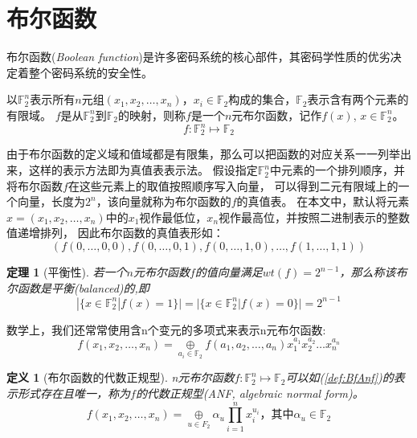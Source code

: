 \documentclass{xduugthesis}
\newtheorem{definition}{定义}
\begin{document}
\section{布尔函数}

布尔函数(\emph{Boolean function})是许多密码系统的核心部件，其密码学性质的优劣决定着整个密码系统的安全性。\par
以$\mathbb{F}_2^n$表示所有$n$元组$(x_1, x_2, \dots ,x_n)$，$x_i\in \mathbb{F}_2$构成的集合，$\mathbb{F}_2$表示含有两个元素的有限域。
$f$是从$\mathbb{F}_2^n$到$\mathbb{F}_2$的映射，则称$f$是一个$n$元布尔函数，记作$f(x)$, $x\in \mathbb{F}_2^n$。
$$
    f: \mathbb{F}_2^n \mapsto \mathbb{F}_2
$$

由于布尔函数的定义域和值域都是有限集，那么可以把函数的对应关系一一列举出来，这样的表示方法即为真值表表示法。
假设指定$\mathbb{F}_2^n$中元素的一个排列顺序，并将布尔函数$f$在这些元素上的取值按照顺序写入向量，
可以得到二元有限域上的一个向量，长度为$2^n$，该向量就称为布尔函数的$f$的真值表。
在本文中，默认将元素$x=(x_1, x_2, \dots , x_n)$中的$x_1$视作最低位，$x_n$视作最高位，并按照二进制表示的整数值递增排列，
因此布尔函数的真值表形如：
$$
    (f(0,\dots ,0,0), f(0,\dots ,0,1), f(0,\dots ,1,0),\dots ,f(1,\dots ,1,1))
$$\par

\newtheorem{mytheorem}{定理}[section]
\begin{mytheorem}[平衡性]\label{thm:balance}
    若一个$n$元布尔函数$f$的值向量满足$wt(f)=2^{n-1}$，那么称该布尔函数是平衡(\emph{balanced})的,即
    \begin{equation}
        |\{x\in \mathbb{F}_2^n |f(x)=1 \}| = |\{x\in \mathbb{F}_2^n |f(x)=0 \}| = 2^{n-1} 
    \end{equation}\par
\end{mytheorem}\par

数学上，我们还常常使用含n个变元的多项式来表示n元布尔函数:
\begin{equation}
    f(x_1,x_2,\dots ,x_n) = \mathop{\oplus}\limits_{a_i \in \mathbb{F}_2}f(a_1,a_2,\dots,a_n)x_1^{a_1}x_2^{a_2}\dots x_n^{a_n}
\end{equation}\par

\begin{definition}[布尔函数的代数正规型]
n元布尔函数$f:\mathbb{F}_2^n \mapsto \mathbb{F}_2$可以如(\ref{def:BfAnf})的表示形式存在且唯一，称为$f$的代数正规型(ANF, algebraic normal form)。
\begin{equation}
f(x_1,x_2,\dots ,x_n) = \mathop{\oplus}\limits_{u \in F_2}\alpha_u \prod\limits_{i=1}^n x_i^{u_i}\mbox{，其中}\alpha_u \in \mathbb{F}_2 \label{def:BfAnf}
\end{equation}
\end{definition}\par
\end{document}
